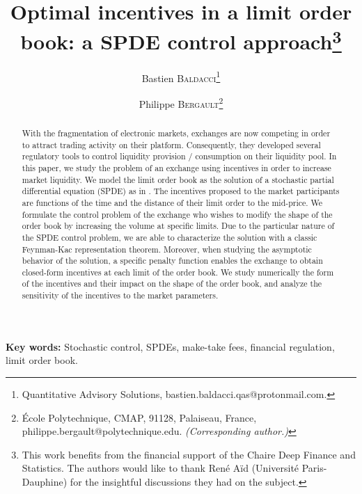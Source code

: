 \documentclass[11pt]{article}
\begin{document}
\title{Optimal incentives in a limit order book: a SPDE control approach\footnote{This work benefits from the financial support of the Chaire Deep Finance and Statistics. The authors would like to thank René Aïd (Université Paris-Dauphine) for the insightful discussions they had on the subject.}}

\author{Bastien \textsc{Baldacci}\footnote{Quantitative Advisory Solutions, bastien.baldacci.qas@protonmail.com.} \and Philippe \textsc{Bergault}\footnote{\'Ecole Polytechnique, CMAP, 91128, Palaiseau, France, philippe.bergault@polytechnique.edu. \textit{(Corresponding author.)}} }
\date{}
\maketitle

\begin{abstract}
With the fragmentation of electronic markets, exchanges are now competing in order to attract trading activity on their platform. Consequently, they developed several regulatory tools to control liquidity provision / consumption on their liquidity pool. In this paper, we study the problem of an exchange using incentives in order to increase market liquidity. We model the limit order book as the solution of a stochastic partial differential equation (SPDE) as in \cite{cont2021stochastic}. The incentives proposed to the market participants are functions of the time and the distance of their limit order to the mid-price. We formulate the control problem of the exchange who wishes to modify the shape of the order book by increasing the volume at specific limits. Due to the particular nature of the SPDE control problem, we are able to characterize the solution with a classic Feynman-Kac representation theorem. Moreover, when studying the asymptotic behavior of the solution, a specific penalty function enables the exchange to obtain closed-form incentives at each limit of the order book. We study numerically the form of the incentives and their impact on the shape of the order book, and analyze the sensitivity of the incentives to the market parameters.
\end{abstract}

\vspace{9mm}

\setlength\parindent{0pt}

\textbf{Key words:} Stochastic control, SPDEs, make-take fees, financial regulation, limit order book.\\
\end{document}
